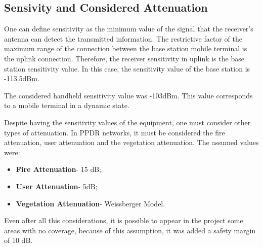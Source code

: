 \documentclass[letterpaper, 10 pt, conference]{ieeeconf}  %
\begin{document}
\subsection{Sensivity and Considered Attenuation}\noindent
One can define sensitivity as the minimum value of the signal that the receiver's antenna can detect the transmitted information. The restrictive factor of the maximum range of the connection between the base station mobile terminal is the uplink connection.  Therefore, the receiver sensitivity in uplink is the base station sensitivity value. In this case, the sensitivity value of the base station is  -113.5dBm. \par\noindent
The considered handheld sensitivity value was -103dBm. This value corresponds to a mobile terminal in a dynamic state. \par\noindent
Despite having the sensitivity values of the equipment, one must consider other types of attenuation. In PPDR networks, it must be considered the fire attenuation, user attenuation and the vegetation attenuation. The assumed values were:
\begin{itemize}
    \item \textbf{Fire Attenuation}- 15 dB;
    \item \textbf{User Attenuation}- 5dB;
    \item \textbf{Vegetation Attenuation}- Weissberger Model\cite{c1}.
\end{itemize}
\par\noindent
Even after all this considerations, it is possible to appear in the project some areas with no coverage, because of this assumption, it was added a safety margin of 10 dB.
\end{document}

